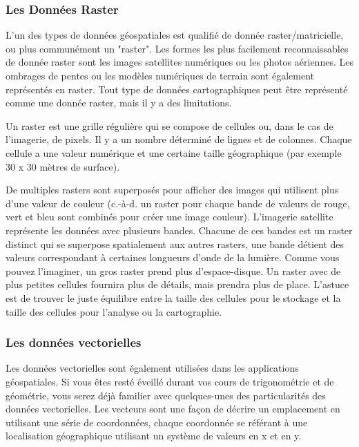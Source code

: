 \subsubsection{Les Données Raster}\label{label_rasterdata}

L'un des types de données géospatiales est qualifié de donnée raster/matricielle, ou plus communément un "raster". Les formes les plus facilement reconnaissables de donnée raster sont les images satellites numériques ou les photos aériennes. Les ombrages de pentes ou les modèles numériques de terrain sont également représentés en raster. Tout type de données cartographiques peut être représenté comme une donnée raster, mais il y a des limitations.

Un raster est une grille régulière qui se compose de cellules ou, dans le cas de l'imagerie, de pixels. Il y a un nombre déterminé de lignes et de colonnes. Chaque cellule a une valeur numérique et une certaine taille géographique (par exemple 30 x 30 mètres de surface).

De multiples rasters sont superposés pour afficher des images qui utilisent plus d'une valeur de couleur (c.-à-d. un raster pour chaque bande de valeurs de rouge, vert et bleu sont combinés pour créer une image couleur). L'imagerie satellite représente les données avec plusieurs bandes. Chacune de ces bandes est un raster distinct qui se superpose spatialement aux autres rasters, une bande détient des valeurs correspondant à certaines longueurs d'onde de la lumière. Comme vous pouvez l'imaginer, un gros raster prend plus d'espace-disque. Un raster avec de plus petites cellules fournira plus de détails, mais prendra plus de place. L'astuce est de trouver le juste équilibre entre la taille des cellules pour le stockage et la taille des cellules pour l'analyse ou la cartographie.

\subsubsection{Les données vectorielles}\label{label_vectordata}

Les données vectorielles sont également utilisées dans les applications géospatiales. Si vous êtes resté éveillé durant vos cours de trigonométrie et de géométrie, vous serez déjà familier avec quelques-unes des particularités des données vectorielles. Les vecteurs sont une façon de décrire un emplacement en utilisant une série de coordonnées, chaque coordonnée se référant à une localisation géographique utilisant un système de valeurs en x et en y.


